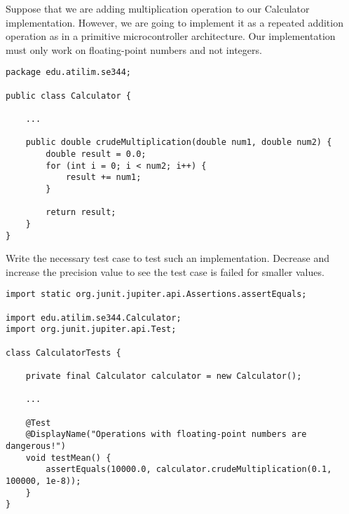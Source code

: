 \begin{exercise}
    Suppose that we are adding multiplication operation to our Calculator implementation. However, we are going to implement it as a repeated addition operation as in a primitive microcontroller architecture. Our implementation must only work on floating-point numbers and not integers.
    
    \begin{lstlisting}[caption={An implementation for multiplication operation with a loop.}]
package edu.atilim.se344;

public class Calculator {
    
    ...
    
    public double crudeMultiplication(double num1, double num2) {
        double result = 0.0;
        for (int i = 0; i < num2; i++) {
            result += num1;
        }
        
        return result;
    }
}
    \end{lstlisting}
    
    Write the necessary test case to test such an implementation. Decrease and increase the precision value to see the test case is failed for smaller values.
\end{exercise}

\begin{solution}
        \begin{lstlisting}
import static org.junit.jupiter.api.Assertions.assertEquals;

import edu.atilim.se344.Calculator;
import org.junit.jupiter.api.Test;

class CalculatorTests {

    private final Calculator calculator = new Calculator();

    ...
    
    @Test
    @DisplayName("Operations with floating-point numbers are dangerous!")
    void testMean() {
        assertEquals(10000.0, calculator.crudeMultiplication(0.1, 100000, 1e-8));
    }
}
    \end{lstlisting}
\end{solution}